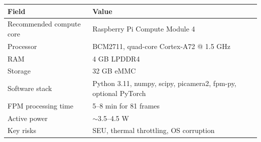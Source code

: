 \begin{longtable}{L{4cm}Y}
\toprule
\textbf{Field} & \textbf{Value} \\
\midrule
Recommended compute core & Raspberry Pi Compute Module 4 \\
Processor & BCM2711, quad-core Cortex-A72 @ 1.5 GHz \\
RAM & 4 GB LPDDR4 \\
Storage & 32 GB eMMC \\
Software stack & Python 3.11, numpy, scipy, picamera2, fpm-py, optional PyTorch \\
FPM processing time & 5--8 min for 81 frames \\
Active power & $\sim$3.5--4.5 W \\
Key risks & SEU, thermal throttling, OS corruption \\
\bottomrule
\end{longtable}
